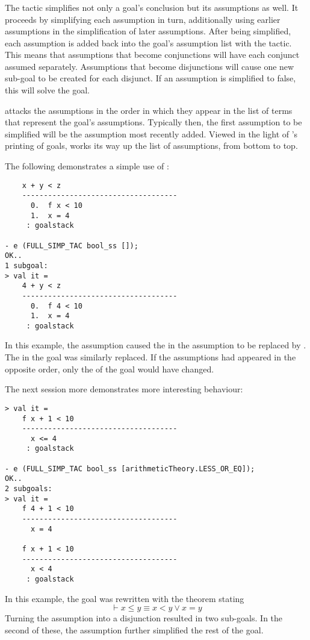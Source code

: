 \subsubsection{}

\noindent
The tactic  simplifies not only a goal's
conclusion but its assumptions as well.  It proceeds by simplifying
each assumption in turn, additionally using earlier assumptions in the
simplification of later assumptions.  After being simplified, each
assumption is added back into the goal's assumption list with the
 tactic.  This means that assumptions that
become conjunctions will have each conjunct assumed separately.
Assumptions that become disjunctions will cause one new sub-goal to be
created for each disjunct.  If an assumption is simplified to false,
this will solve the goal.

 attacks the assumptions in the order in which
they appear in the list of terms that represent the goal's
assumptions.  Typically then, the first assumption to be simplified
will be the assumption most recently added.  Viewed in the light of
's printing of goals,  works its
way up the list of assumptions, from bottom to top.

The following demonstrates a simple use of :
\begin{session}
\begin{verbatim}
    x + y < z
    ------------------------------------
      0.  f x < 10
      1.  x = 4
     : goalstack

- e (FULL_SIMP_TAC bool_ss []);
OK..
1 subgoal:
> val it =
    4 + y < z
    ------------------------------------
      0.  f 4 < 10
      1.  x = 4
     : goalstack
\end{verbatim}
\end{session}
In this example, the assumption  caused the 
in the assumption  to be replaced by .  The
 in the goal was similarly replaced.  If the assumptions had
appeared in the opposite order, only the  of the goal would
have changed.

The next session more demonstrates more interesting behaviour:
\begin{session}
\begin{verbatim}
> val it =
    f x + 1 < 10
    ------------------------------------
      x <= 4
     : goalstack

- e (FULL_SIMP_TAC bool_ss [arithmeticTheory.LESS_OR_EQ]);
OK..
2 subgoals:
> val it =
    f 4 + 1 < 10
    ------------------------------------
      x = 4

    f x + 1 < 10
    ------------------------------------
      x < 4
     : goalstack
\end{verbatim}
\end{session}
In this example, the goal was rewritten with the theorem stating
\[
\vdash x \leq y \equiv x < y \lor x = y
\]
Turning the assumption into a disjunction resulted in two sub-goals.
In the second of these, the assumption  further
simplified the rest of the goal.

